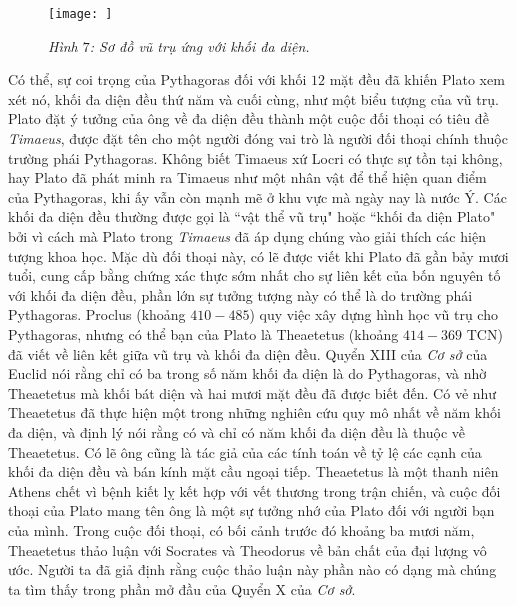 \begin{multicols}{2}
	\begin{figure}[H]
		\vspace*{-5pt}
		\centering
		\captionsetup{labelformat= empty, justification=centering}
		\texttt{[image: ]}
		\caption{\small\textit{\color{lichsutoanhoc}Hình $7$: Sơ đồ vũ trụ ứng với khối đa diện.}}
		\vspace*{-10pt}
	\end{figure}
	Có thể, sự coi trọng của Pythagoras đối với khối $12$ mặt đều đã khiến Plato xem xét nó, khối đa diện đều thứ năm và cuối cùng, như một biểu tượng của vũ trụ. 
	Plato đặt ý tưởng của ông về đa diện đều thành một cuộc đối thoại có tiêu đề \textit{Timaeus}, được đặt tên cho một người đóng vai trò là người đối thoại chính thuộc trường phái Pythagoras. Không biết Timaeus xứ Locri có thực sự tồn tại không, hay Plato đã phát minh ra Timaeus như một nhân vật để thể hiện quan điểm của Pythagoras, khi ấy vẫn còn mạnh mẽ ở khu vực mà ngày nay là nước Ý. 
	\vskip 0.1cm
	Các khối đa diện đều thường được gọi là ``vật thể vũ trụ" hoặc ``khối đa diện Plato" bởi vì cách mà Plato trong \textit{Timaeus} đã áp dụng chúng vào giải thích các hiện tượng khoa học.
	\vskip 0.1cm
	Mặc dù đối thoại này, có lẽ được viết khi Plato đã gần bảy mươi tuổi, cung cấp bằng chứng xác thực sớm nhất cho sự liên kết của bốn nguyên tố với khối đa diện đều, phần lớn sự tưởng tượng này có thể là do trường phái Pythagoras.
	\vskip 0.1cm
	Proclus (khoảng $410-485$) quy việc xây dựng hình học vũ trụ cho Pythagoras, nhưng có thể bạn của Plato là Theaetetus (khoảng $414-369$ TCN) đã viết về liên kết giữa vũ trụ và khối đa diện đều. 
	\vskip 0.1cm
	Quyển XIII của \textit{Cơ sở} của Euclid nói rằng chỉ có ba trong số năm khối đa diện là do Pythagoras, và nhờ Theaetetus mà khối bát diện và hai mươi mặt đều đã được biết đến.
	\vskip 0.1cm
	Có vẻ như Theaetetus đã thực hiện một trong những nghiên cứu quy mô nhất về năm khối đa diện, và định lý nói rằng có và chỉ có năm khối đa diện đều là thuộc về Theaetetus. Có lẽ ông cũng là tác giả của các tính toán về tỷ lệ các cạnh của khối đa diện đều và bán kính mặt cầu ngoại tiếp. 
	\vskip 0.1cm
	Theaetetus là một thanh niên Athens chết vì bệnh kiết lỵ kết hợp với vết thương trong trận chiến, và cuộc đối thoại của Plato mang tên ông là một sự tưởng nhớ của Plato đối với người bạn của mình.
	\vskip 0.1cm
	Trong cuộc đối thoại, có bối cảnh trước đó khoảng ba mươi năm, Theaetetus thảo luận với Socrates và Theodorus về bản chất của đại lượng vô ước. Người ta đã giả định rằng cuộc thảo luận này phần nào có dạng mà chúng ta tìm thấy trong phần mở đầu của Quyển X của \textit{Cơ sở}.

\end{multicols}
